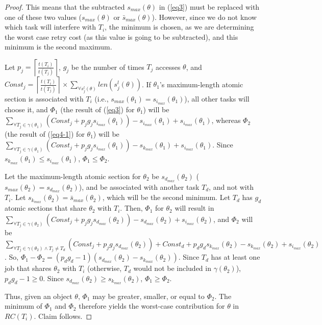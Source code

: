 \documentclass[a4paper,english]{article}
\newtheorem{proof}{Proof}
\begin{document}
\begin{proof}
This means that the subtracted $s_{max}(\theta)$ in (\ref{eq3})
must be replaced with one of these two values ($s_{max}(\theta)$ or $\bar{s}_{max}(\theta)$). However, since we do not know  which task will interfere with $T_i$, the minimum is chosen, as we are determining the worst case retry cost (as this value is going to be subtracted),
and this minimum is the second maximum.


Let $p_j = \left\lceil{\frac{t(T_{i})}{t(T_{j})}}\right\rceil$,
$g_j$ be the number of times $T_j$ accesses $\theta$,  
and 
$Const_j = \left\lceil{\frac{t(T_{i})}{t(T_{j})}}\right\rceil \times \sum_{\forall{s_{j}^{l}(\theta)}}{len(s_{j}^{l}(\theta))}$. 
If $\theta_1$'s maximum-length atomic section is associated with $T_i$ (i.e., $s_{max}(\theta_1)=s_{i_{max}}(\theta_1)$), all other tasks will choose it, and $\Phi_1$ (the result of (\ref{eq3}) for $\theta_1$) will be 
$\sum_{\forall {T_j \in \gamma(\theta_1)}} \left(Const_j +p_j g_j s_{i_{max}}(\theta_1)\right)-s_{i_{max}}(\theta_1)+s_{i_{max}}(\theta_1)$,
whereas $\Phi_2$ (the result of (\ref{eq4-1}) for $\theta_1$) will be $\sum_{\forall {T_j \in \gamma(\theta_1)}} \left(Const_j+ p_j g_j s_{i_{max}}(\theta_1)\right)-s_{k_{max}}(\theta_1)+s_{i_{max}}(\theta_1)$. 
Since $s_{k_{max}}(\theta_1)\leq s_{i_{max}}(\theta_1)$, $\Phi_1 \le \Phi_2$.


Let the maximum-length atomic section for $\theta_2$ be $s_{d_{max}}(\theta_2)$  
($s_{max}(\theta_2)=s_{d_{max}}(\theta_2)$), 
and be associated with another task $T_{d}$, and not with $T_{i}$. Let $ s_{k_{max}}(\theta_2) = \bar{s}_{max}(\theta_2)$,  which will be the second minimum. 
Let $T_{d}$ has $g_d$ atomic sections that share $\theta_2$ with $T_i$. Then, $\Phi_1$ 
for $\theta_2$ will result in $\sum_{\forall T_j \in \gamma(\theta_2)} \left(Const_j +p_j g_j s_{d_{max}}(\theta_2)\right) -s_{d_{max}}(\theta_2)+s_{i_{max}}(\theta_2)$,
and $\Phi_2$ will be $\sum_{\forall T_j \in \gamma(\theta_2) \wedge T_j \ne T_d} \left(Const_j+ p_j g_j s_{d_{max}}(\theta_2)\right)+ Const_d+p_d g_d s_{k_{max}}(\theta_2) -s_{k_{max}}(\theta_2)+s_{i_{max}}(\theta_2)$. So, $\Phi_1 - \Phi_2 =(p_d g_d -1)(s_{d_{max}}(\theta_2)-s_{k_{max}}(\theta_2))$. Since $T_d$ has at least one job that shares $\theta_2$ with $T_i$ (otherwise, $T_d$ would not be included in $\gamma (\theta_2)$), $p_d g_d -1 \ge 0$. Since $s_{d_{max}}(\theta_2) \ge s_{k_{max}}(\theta_2)$, $\Phi_1 \ge \Phi_2$. 


Thus, given an object $\theta$, $\Phi_1$ may be greater, smaller, or equal to $\Phi_2$. The minimum of $\Phi_1$ and $\Phi_2$ therefore yields the worst-case contribution for $\theta$ in $RC(T_i)$. Claim follows.
\end{proof}
\end{document}
